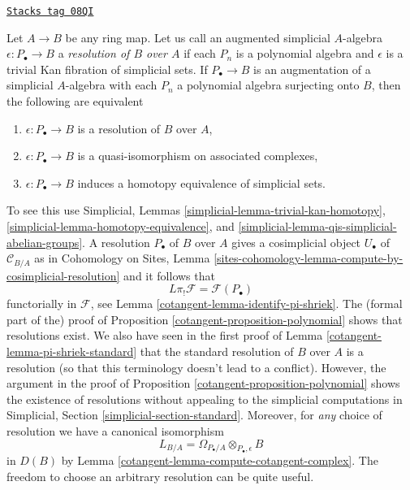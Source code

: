 \begin{remark}[Resolutions]

\label{cotangent-remark-resolution}
\href{https://stacks.math.columbia.edu/tag/08QI}{\texttt{Stacks tag 08QI}}

Let $A \to B$ be any ring map. Let us call an augmented simplicial $A$-algebra
$\epsilon : P_\bullet \to B$ a {\it resolution of $B$ over $A$} if
each $P_n$ is a polynomial algebra and $\epsilon$ is a trivial Kan fibration
of simplicial sets. If $P_\bullet \to B$ is an augmentation of a simplicial
$A$-algebra with each $P_n$ a polynomial algebra surjecting onto $B$, then
the following are equivalent
\begin{enumerate}
\item $\epsilon : P_\bullet \to B$ is a resolution of $B$ over $A$,
\item $\epsilon : P_\bullet \to B$ is a quasi-isomorphism on
associated complexes,
\item $\epsilon : P_\bullet \to B$ induces a homotopy equivalence
of simplicial sets.
\end{enumerate}
To see this use Simplicial, Lemmas
\ref{simplicial-lemma-trivial-kan-homotopy},
\ref{simplicial-lemma-homotopy-equivalence}, and
\ref{simplicial-lemma-qis-simplicial-abelian-groups}.
A resolution $P_\bullet$ of $B$ over $A$ gives a cosimplicial object
$U_\bullet$ of $\mathcal{C}_{B/A}$ as in Cohomology on Sites, Lemma
\ref{sites-cohomology-lemma-compute-by-cosimplicial-resolution}
and it follows that
$$
L\pi_!\mathcal{F} = \mathcal{F}(P_\bullet)
$$
functorially in $\mathcal{F}$, see Lemma \ref{cotangent-lemma-identify-pi-shriek}.
The (formal part of the) proof of Proposition \ref{cotangent-proposition-polynomial}
shows that resolutions exist. We also have seen in the first proof of
Lemma \ref{cotangent-lemma-pi-shriek-standard} that the standard resolution of $B$
over $A$ is a resolution (so that this terminology doesn't lead to a conflict).
However, the argument in the proof of Proposition \ref{cotangent-proposition-polynomial}
shows the existence of resolutions without appealing to the simplicial
computations in Simplicial, Section \ref{simplicial-section-standard}.
Moreover, for {\it any} choice of resolution we have a canonical isomorphism
$$
L_{B/A} = \Omega_{P_\bullet/A} \otimes_{P_\bullet, \epsilon} B
$$
in $D(B)$ by Lemma \ref{cotangent-lemma-compute-cotangent-complex}. The freedom to
choose an arbitrary resolution can be quite useful.
\end{remark}

